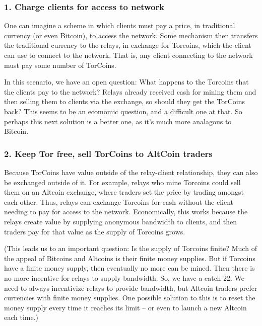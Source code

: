 \subsubsection{1. Charge clients for access to network}

One can imagine a scheme in which clients must pay a price, in traditional currency (or even Bitcoin), to access the network. Some mechanism then transfers the traditional currency to the relays, in exchange for Torcoins, which the client can use to connect to the network. That is, any client connecting to the network must pay some number of TorCoins. 

In this scenario, we have an open question: What happens to the Torcoins that the clients pay to the network? Relays already received cash for mining them and then selling them to clients via the exchange, so should they get the TorCoins back? This seems to be an ecomomic question, and a difficult one at that. So perhaps this next solution is a better one, as it's much more analagous to Bitcoin.

\subsubsection{2. Keep Tor free, sell TorCoins to AltCoin traders}

Because TorCoins have value outside of the relay-client relationship, they can also be exchanged outside of it. For example, relays who mine Torcoins could sell them on an Altcoin exchange, where traders set the price by trading amongst each other. Thus, relays can exchange Torcoins for cash without the client needing to pay for access to the network. Economically, this works because the relays create value by supplying anonymous bandwidth to clients, and then traders pay for that value as the supply of Torcoins grows.

(This leads us to an important question: Is the supply of Torcoins finite? Much of the appeal of Bitcoins and Altcoins is their finite money supplies. But if Torcoins have a finite money supply, then eventually no more can be mined. Then there is no more incentive for relays to supply bandwidth. So, we have a catch-22. We need to always incentivize relays to provide bandwidth, but Altcoin traders prefer currencies with finite money supplies. One possible solution to this is to reset the money supply every time it reaches its limit -- or even to launch a new Altcoin each time.)